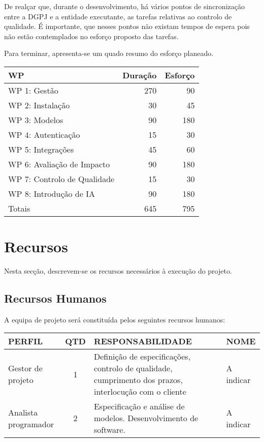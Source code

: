 De realçar que, durante o desenvolvimento, há vários pontos de sincronização entre a DGPJ e a entidade executante, as 
tarefas relativas ao controlo de qualidade. É importante, que nesses pontos não existam tempos de espera pois não estão 
contemplados no esforço proposto das tarefas.

Para terminar, apresenta-se um quado resumo do esforço planeado.

\begin{tabular}{|l|r|r|}
    \hline
    \textbf{WP} & \textbf{Duração} & \textbf{Esforço} \\
    \hline
    WP 1: Gestão & 270 & 90 \\
    \hline
    WP 2: Instalação & 30 & 45 \\
    \hline
    WP 3: Modelos & 90 & 180 \\
    \hline
    WP 4: Autenticação & 15 & 30 \\
    \hline
    WP 5: Integrações & 45 & 60 \\
    \hline
    WP 6: Avaliação de Impacto & 90 & 180 \\
    \hline
    WP 7: Controlo de Qualidade & 15 & 30 \\
    \hline
    WP 8: Introdução de IA & 90 & 180 \\
    \hline\hline
    Totais & 645 & 795 \\
    \hline
\end{tabular}


\section{Recursos}

Nesta secção, descrevem-se os recursos necessários à execução do projeto.

\subsection{Recursos Humanos}

A equipa de projeto será constituída pelos seguintes recursos humanos:

\begin{table}[h!]
    \centering
    \begin{tabular}{|l|c|p{8cm}|p{4cm}|}
        \hline
        \textbf{PERFIL} & \textbf{QTD} & \textbf{RESPONSABILIDADE} & \textbf{NOME} \\
        \hline
        Gestor de projeto & 1 & Definição de especificações, controlo de qualidade, cumprimento dos prazos, interlocução com o cliente & A indicar \\
        \hline
        Analista programador & 2 & Especificação e análise de modelos. Desenvolvimento de software. & A indicar \\
        \hline
    \end{tabular}
    \label{tab:responsabilidades_perfis}
\end{table}

